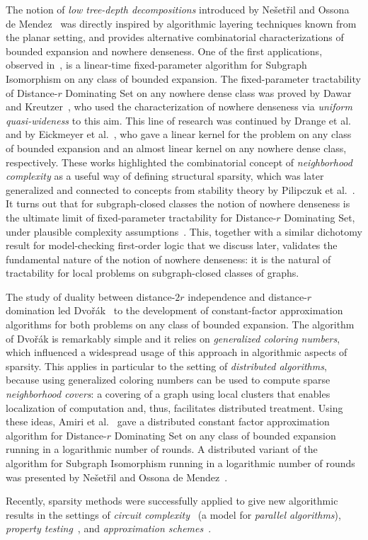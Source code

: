 The notion of {\em{low tree-depth decompositions}} introduced by Ne\v{s}et\v{r}il and Ossona de Mendez~\cite{NesetrilM08a} was directly inspired by algorithmic layering techniques known from the planar setting,
and provides alternative combinatorial characterizations of bounded expansion and nowhere denseness.
One of the first applications, observed in~\cite{NesetrilM08a}, is a linear-time fixed-parameter algorithm for Subgraph Isomorphism on any class of bounded expansion.
The fixed-parameter tractability of Distance-$r$ Dominating Set on any nowhere dense class was proved by Dawar and Kreutzer~\cite{DawarK09}, 
who used the characterization of nowhere denseness via {\em{uniform quasi-wideness}} to this aim.
This line of research was continued by Drange et al.~\cite{DrangeDFKLPPRVS16} and by Eickmeyer et al.~\cite{eickmeyer2016neighborhood}, 
who gave a linear kernel for the problem on any class of bounded expansion and an almost linear kernel on any nowhere dense class, respectively.
These works highlighted the combinatorial concept of {\em{neighborhood complexity}} as a useful way of defining structural sparsity, 
which was later generalized and connected to concepts from stability theory by Pilipczuk et al.~\cite{pilipczuk2018number}.
It turns out that for subgraph-closed classes the notion of nowhere denseness is the ultimate limit of fixed-parameter tractability for Distance-$r$ Dominating Set,
under plausible complexity assumptions~\cite{DrangeDFKLPPRVS16}. This, together with a similar dichotomy result for model-checking first-order logic that we discuss later,
validates the fundamental nature of the notion of nowhere denseness: it is the natural of tractability for local problems on subgraph-closed classes of graphs.

The study of duality between distance-$2r$ independence and distance-$r$ domination led Dvo\v{r}\'ak~\cite{Dvorak13}
to the development of constant-factor approximation algorithms for both problems on any class of bounded expansion.
The algorithm of Dvo\v{r}\'ak is remarkably simple and it relies on {\em{generalized coloring numbers}}, which influenced a widespread usage of this approach in algorithmic aspects of sparsity.
This applies in particular to the setting of {\em{distributed algorithms}}, because using generalized coloring numbers can be used to compute sparse {\em{neighborhood covers}}: 
a covering of a graph using local clusters that enables localization of computation and, thus, facilitates distributed treatment.
Using these ideas, Amiri et al.~\cite{AmiriMRS18} gave a distributed constant factor approximation algorithm for Distance-$r$ Dominating Set on any class of bounded expansion running in a logarithmic number of rounds.
A distributed variant of the algorithm for Subgraph Isomorphism running in a logarithmic number of rounds was presented by Ne\v{s}et\v{r}il and Ossona de Mendez~\cite{NesetrilM16}.

Recently, sparsity methods were successfully applied to give new algorithmic results in the settings of {\em{circuit complexity}}~\cite{PilipczukST18} 
(a model for {\em{parallel algorithms}}), {\em{property testing}}~\cite{AdlerH18}, and {\em{approximation schemes}}~\cite{Har-PeledQ17}.


